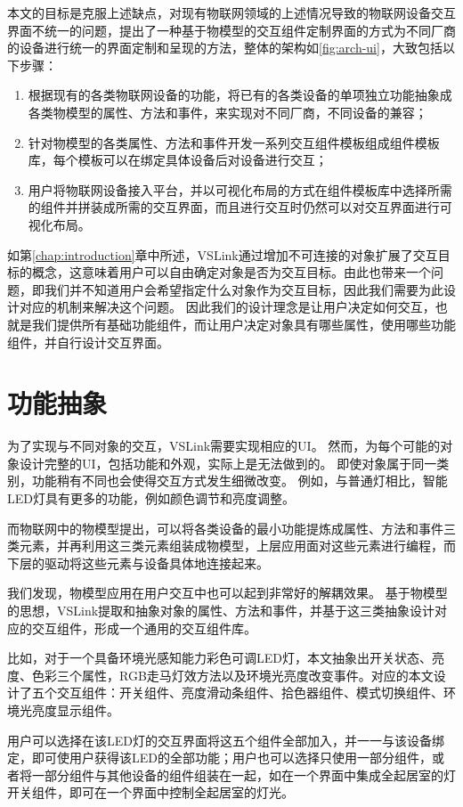 本文的目标是克服上述缺点，对现有物联网领域的上述情况导致的物联网设备交互界面不统一的问题，提出了一种基于物模型的交互组件定制界面的方式为不同厂商的设备进行统一的界面定制和呈现的方法，整体的架构如\autoref{fig:arch-ui}，大致包括以下步骤：

\begin{enumerate}
	\item 根据现有的各类物联网设备的功能，将已有的各类设备的单项独立功能抽象成各类物模型的属性、方法和事件，来实现对不同厂商，不同设备的兼容；
	\item 针对物模型的各类属性、方法和事件开发一系列交互组件模板组成组件模板库，每个模板可以在绑定具体设备后对设备进行交互；
	\item 用户将物联网设备接入平台，并以可视化布局的方式在组件模板库中选择所需的组件并拼装成所需的交互界面，而且进行交互时仍然可以对交互界面进行可视化布局。
\end{enumerate}

如第\ref{chap:introduction}章中所述，VSLink通过增加不可连接的对象扩展了交互目标的概念，这意味着用户可以自由确定对象是否为交互目标。由此也带来一个问题，即我们并不知道用户会希望指定什么对象作为交互目标，因此我们需要为此设计对应的机制来解决这个问题。
因此我们的设计理念是让用户决定如何交互，也就是我们提供所有基础功能组件，而让用户决定对象具有哪些属性，使用哪些功能组件，并自行设计交互界面。

\section{功能抽象}
为了实现与不同对象的交互，VSLink需要实现相应的UI。
然而，为每个可能的对象设计完整的UI，包括功能和外观，实际上是无法做到的。
即使对象属于同一类别，功能稍有不同也会使得交互方式发生细微改变。
例如，与普通灯相比，智能LED灯具有更多的功能，例如颜色调节和亮度调整。

而物联网中的物模型提出，可以将各类设备的最小功能提炼成属性、方法和事件三类元素，并再利用这三类元素组装成物模型，上层应用面对这些元素进行编程，而下层的驱动将这些元素与设备具体地连接起来。

我们发现，物模型应用在用户交互中也可以起到非常好的解耦效果。
基于物模型的思想，VSLink提取和抽象对象的属性、方法和事件，并基于这三类抽象设计对应的交互组件，形成一个通用的交互组件库。

比如，对于一个具备环境光感知能力彩色可调LED灯，本文抽象出开关状态、亮度、色彩三个属性，RGB走马灯效方法以及环境光亮度改变事件。对应的本文设计了五个交互组件：开关组件、亮度滑动条组件、拾色器组件、模式切换组件、环境光亮度显示组件。

用户可以选择在该LED灯的交互界面将这五个组件全部加入，并一一与该设备绑定，即可使用户获得该LED的全部功能；用户也可以选择只使用一部分组件，或者将一部分组件与其他设备的组件组装在一起，如在一个界面中集成全起居室的灯开关组件，即可在一个界面中控制全起居室的灯光。

